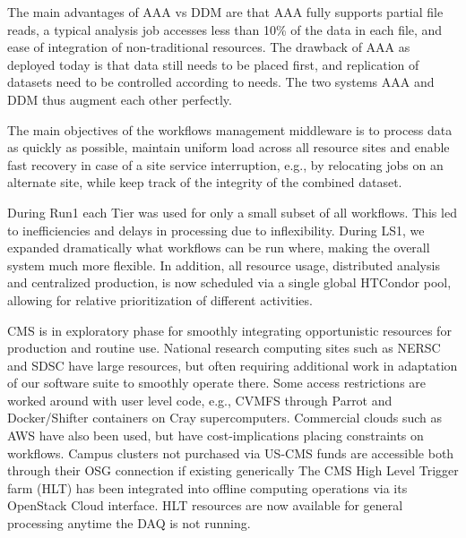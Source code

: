 \documentclass[11pt,a4paper]{article}
\begin{document}
The main advantages of AAA vs DDM are that AAA fully supports partial file reads,
a typical analysis job accesses less than 10\% of the data in each file, and ease of integration
of non-traditional resources. The drawback of AAA as deployed today is that data still needs to be placed first,
and replication of datasets need to be controlled according to needs. 
The two systems AAA and DDM thus augment each other perfectly.


The main objectives of the workflows management middleware is to
process data as quickly as possible, maintain uniform load across all
resource sites and enable fast recovery in case of a site service
interruption, e.g., by relocating jobs on an alternate site, while
keep track of the integrity of the combined dataset.  

During Run1 each Tier was used for only a small subset of all workflows.
This led to inefficiencies and delays in processing due to inflexibility.
During LS1, we expanded dramatically what workflows can be run where, making the overall system
much more flexible. In addition, all resource usage, distributed analysis and centralized production,
is now scheduled via a single global HTCondor pool, allowing for relative prioritization of different
activities.


CMS is in exploratory phase for smoothly integrating opportunistic
resources for production and routine use. National research computing
sites such as NERSC and SDSC have large resources, but often requiring
additional work in adaptation of our software suite to smoothly
operate there. Some access restrictions are worked around with user
level code, e.g., CVMFS through Parrot and Docker/Shifter containers
on Cray supercomputers. Commercial clouds such as AWS have also been
used, but have cost-implications placing constraints on workflows.  
Campus clusters not purchased via US-CMS funds are accessible both
through their OSG connection if existing generically
The CMS High Level Trigger farm (HLT) has been integrated into offline computing operations
via its OpenStack Cloud interface. HLT resources are now available for general processing anytime the
DAQ is not running.
\end{document}

